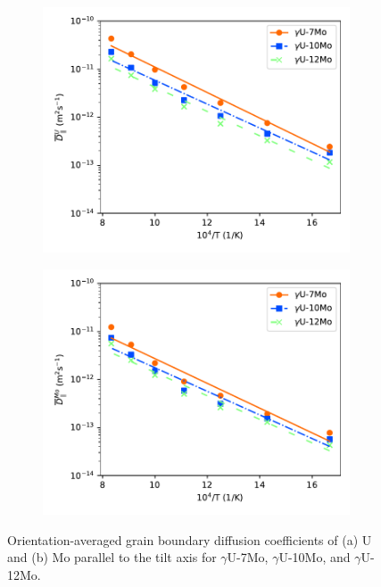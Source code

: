 \documentclass{elsarticle}
\providecommand{\DIFadd}[1]{{\protect\color{blue} \sf #1}} %
\providecommand{\DIFdel}[1]{}
\providecommand{\DIFaddFL}[1]{\DIFadd{#1}} %
\providecommand{\DIFdelFL}[1]{\DIFdel{#1}} %
\providecommand{\DIFaddbeginFL}{} %
\providecommand{\DIFaddendFL}{} %
\providecommand{\DIFdelbeginFL}{} %
\providecommand{\DIFdelendFL}{} %
\begin{document}
\begin{figure}[!ht]
\DIFaddbeginFL \begin{subfigure}{0.49\textwidth}
	\DIFaddendFL \centering
	\DIFdelbeginFL %
\DIFdelendFL \caption{\DIFdelbeginFL \DIFdelFL{Grain boundary orientation-averaged diffusion coefficients for $\gamma$U-7Mo, $\gamma$U-10Mo, and $\gamma$U-12Mo.}\DIFdelendFL }
	\DIFaddbeginFL \includegraphics[width=\textwidth]{comp_U_Dz.pdf}
\end{subfigure}
\begin{subfigure}{0.49\textwidth}
	\centering
	\caption{}
	\includegraphics[width=\textwidth]{comp_Mo_Dz.pdf}
\end{subfigure}
\caption{\DIFaddFL{Orientation-averaged grain boundary diffusion coefficients of (a) U and (b) Mo parallel to the tilt axis for $\gamma$U-7Mo, $\gamma$U-10Mo, and $\gamma$U-12Mo.}}
\DIFaddendFL \label{fig:comp}
\end{figure}
\end{document}
